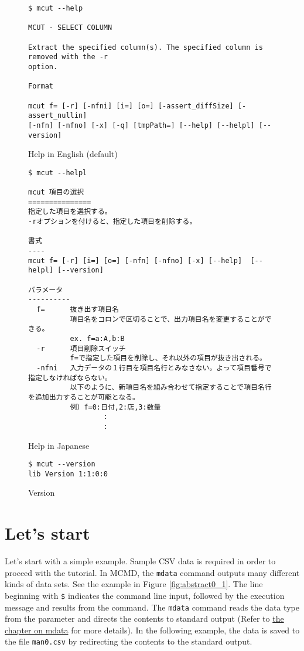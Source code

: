 \begin{figure}[htbp]
\begin{Verbatim}[baselinestretch=0.7,frame=single]
$ mcut --help

MCUT - SELECT COLUMN

Extract the specified column(s). The specified column is removed with the -r
option.

Format

mcut f= [-r] [-nfni] [i=] [o=] [-assert_diffSize] [-assert_nullin]
[-nfn] [-nfno] [-x] [-q] [tmpPath=] [--help] [--helpl] [--version]
\end{Verbatim}

\caption{Help in English (default)\label{fig:abstract3_1}}
\end{figure}

\begin{figure}[htbp]
\begin{Verbatim}[baselinestretch=0.7,frame=single]
$ mcut --helpl

mcut 項目の選択
===============
指定した項目を選択する。
-rオプションを付けると、指定した項目を削除する。

書式
----
mcut f= [-r] [i=] [o=] [-nfn] [-nfno] [-x] [--help]  [--helpl] [--version]  

パラメータ
----------
  f=      抜き出す項目名
          項目名をコロンで区切ることで、出力項目名を変更することができる。
          ex. f=a:A,b:B
  -r      項目削除スイッチ
          f=で指定した項目を削除し、それ以外の項目が抜き出される。
  -nfni   入力データの１行目を項目名行とみなさない。よって項目番号で指定しなければならない。
          以下のように、新項目名を組み合わせて指定することで項目名行を追加出力することが可能となる。
          例）f=0:日付,2:店,3:数量
                  :
                  :

\end{Verbatim}
\caption{Help in Japanese\label{fig:abstract3_2}}
\end{figure}

\begin{figure}[htbp]
\begin{Verbatim}[baselinestretch=0.7,frame=single]
$ mcut --version
lib Version 1:1:0:0
\end{Verbatim}
\caption{Version\label{fig:abstract3_3}}
\end{figure}

\section{Let's start\label{sect:helloWorld}}
Let's start with a simple example. Sample CSV data is required in order to proceed with the tutorial. In MCMD, the \verb|mdata| command outputs many different kinds of data sets. See the example in Figure \ref{fig:abstract0_1}.
The line beginning with \verb|$| indicates the command line input, followed by the execution message and results from the command. The \verb|mdata| command reads the data type from the parameter and directs the contents to standard output (Refer to \hyperref[sect:mdata]{the chapter on mdata} for more details). In the following example, the data is saved to the file \verb|man0.csv| by redirecting the contents to the standard output.

